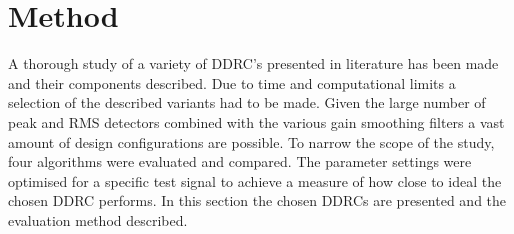 \documentclass[../main2.tex]{subfiles}
\providecommand{\rootdir}{..}
\begin{document}
\section{Method}\label{method}
A thorough study of a variety of DDRC's presented in literature has been made and their components described. Due to time and computational limits a selection of the described variants had to be made. Given the large number of peak and RMS detectors combined with the various gain smoothing filters a vast amount of design configurations are possible. To narrow the scope of the study, four algorithms were evaluated and compared. The parameter settings were optimised for a specific test signal to achieve a measure of how close to ideal the chosen DDRC performs.  In this section the chosen DDRCs are presented and the evaluation method described.









\end{document}
